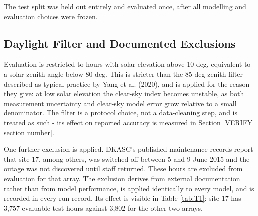 The test split was held out entirely and evaluated once, after all
modelling and evaluation choices were frozen.

\subsection{Daylight Filter and Documented Exclusions}

Evaluation is restricted to hours with solar elevation above 10 deg,
equivalent to a solar zenith angle below 80 deg. This is stricter than
the 85 deg zenith filter described as typical practice by Yang et al.
(2020), and is applied for the reason they give: at low solar
elevation the clear-sky index becomes unstable, as both measurement
uncertainty and clear-sky model error grow relative to a small
denominator. The filter is a protocol choice, not a data-cleaning step,
and is treated as such - its effect on reported accuracy is measured in
Section [VERIFY section number].

One further exclusion is applied. DKASC's published maintenance records
report that site 17, among others, was switched off between 5 and 9 June
2015 and the outage was not discovered until staff returned. These hours
are excluded from evaluation for that array. The exclusion derives from
external documentation rather than from model performance, is applied
identically to every model, and is recorded in every run record. Its
effect is visible in Table \ref{tab:T1}: site 17 has 3,757 evaluable test hours
against 3,802 for the other two arrays.
